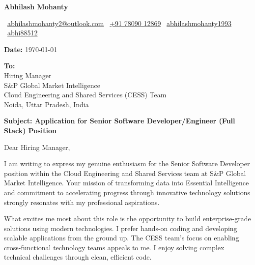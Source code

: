 \documentclass[10pt, letterpaper]{article}
\begin{document}
\begin{center}
    {\fontsize{20pt}{20pt}\selectfont \textbf{Abhilash Mohanty}}

    \vspace{8pt}

    \faEnvelope\ \href{mailto:abhilashmohanty2@outlook.com}{abhilashmohanty2@outlook.com} \quad
    \faPhone\ \href{tel:+917809012869}{+91 78090 12869} \quad
    \faLinkedin\ \href{https://linkedin.com/in/abhilashmohanty1993}{abhilashmohanty1993} \quad
    \faGithub\ \href{https://github.com/abhi88512}{abhi88512}
\end{center}

\vspace{20pt}

\textbf{Date:} \today

\vspace{10pt}

\textbf{To:}\\
Hiring Manager\\
S\&P Global Market Intelligence\\
Cloud Engineering and Shared Services (CESS) Team\\
Noida, Uttar Pradesh, India

\vspace{15pt}

\textbf{Subject: Application for Senior Software Developer/Engineer (Full Stack) Position}

\vspace{15pt}

Dear Hiring Manager,

\vspace{10pt}

I am writing to express my genuine enthusiasm for the Senior Software Developer position within the Cloud Engineering and Shared Services team at S\&P Global Market Intelligence. Your mission of transforming data into Essential Intelligence and commitment to accelerating progress through innovative technology solutions strongly resonates with my professional aspirations.

\vspace{8pt}

What excites me most about this role is the opportunity to build enterprise-grade solutions using modern technologies. I prefer hands-on coding and developing scalable applications from the ground up. The CESS team's focus on enabling cross-functional technology teams appeals to me. I enjoy solving complex technical challenges through clean, efficient code.
\end{document}
